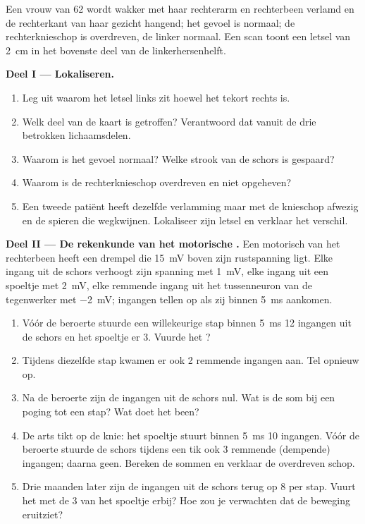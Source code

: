 \begin{problem}
\label{pb:g12:brain-and-movement:1}
Een vrouw van 62 wordt wakker met haar rechterarm en rechterbeen verlamd
en de rechterkant van haar gezicht hangend; het gevoel is normaal; de
rechterknieschop is overdreven, de linker normaal. Een scan toont een
letsel van \qty{2}{cm} in het bovenste deel van de linkerhersenhelft.

\medskip
\noindent\textbf{Deel I --- Lokaliseren.}
\begin{enumerate}
  \item Leg uit waarom het letsel links zit hoewel het tekort rechts is.
  \item Welk deel van de kaart is getroffen? Verantwoord dat vanuit de
        drie betrokken lichaamsdelen.
  \item Waarom is het gevoel normaal? Welke strook van de schors is
        gespaard?
  \item Waarom is de rechterknieschop overdreven en niet opgeheven?
  \item Een tweede patiënt heeft dezelfde verlamming maar met de
        knieschop afwezig en de spieren die wegkwijnen. Lokaliseer zijn
        letsel en verklaar het verschil.
\end{enumerate}

\medskip
\noindent\textbf{Deel II --- De rekenkunde van het motorische .}
Een motorisch  van het rechterbeen heeft een drempel die
\qty{15}{mV} boven zijn rustspanning ligt. Elke ingang uit de schors
verhoogt zijn spanning met \qty{1}{mV}, elke ingang uit een spoeltje met
\qty{2}{mV}, elke remmende ingang uit het tussenneuron van de tegenwerker
met \qty{-2}{mV}; ingangen tellen op als zij binnen \qty{5}{ms} aankomen.
\begin{enumerate}[resume]
  \item Vóór de beroerte stuurde een willekeurige stap binnen \qty{5}{ms}
        12 ingangen uit de schors en het spoeltje er 3. Vuurde het ?
  \item Tijdens diezelfde stap kwamen er ook 2 remmende ingangen aan. Tel
        opnieuw op.
  \item Na de beroerte zijn de ingangen uit de schors nul. Wat is de som
        bij een poging tot een stap? Wat doet het been?
  \item De arts tikt op de knie: het spoeltje stuurt binnen \qty{5}{ms} 10
        ingangen. Vóór de beroerte stuurde de schors tijdens een tik ook 3
        remmende (dempende) ingangen; daarna geen. Bereken de sommen en
        verklaar de overdreven schop.
  \item Drie maanden later zijn de ingangen uit de schors terug op 8 per
        stap. Vuurt het  met de 3 van het spoeltje erbij? Hoe zou je
        verwachten dat de beweging eruitziet?
\end{enumerate}


\end{problem}
